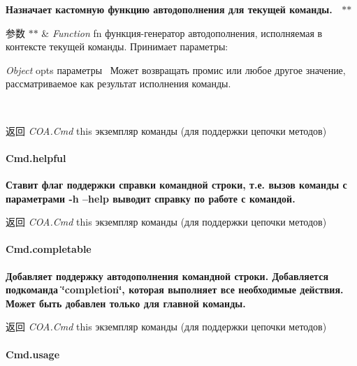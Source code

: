 {\bfseries {\bfseries {\bfseries  Назначает кастомную функцию автодополнения для текущей команды.~\newline
 $\ast$$\ast$
\begin{DoxyParams}{参数}
{\em $\ast$$\ast$} & {\itshape Function} {\ttfamily fn} функция-\/генератор автодополнения, исполняемая в контексте текущей команды. Принимает параметры\+:~\newline

\begin{DoxyItemize}
\item {\itshape Object} {\ttfamily opts} параметры~\newline
 Может возвращать промис или любое другое значение, рассматриваемое как результат исполнения команды.~\newline
 {\bfseries }
\end{DoxyItemize}\\
\hline
\end{DoxyParams}
\begin{DoxyReturn}{返回}
{\bfseries } {\itshape C\+O\+A.\+Cmd} {\ttfamily this} экземпляр команды (для поддержки цепочки методов)
\end{DoxyReturn}
\paragraph*{Cmd.\+helpful}}}}

{\bfseries {\bfseries {\bfseries  Ставит флаг поддержки справки командной строки, т.\+е. вызов команды с параметрами -\/h --help выводит справку по работе с командой.~\newline
 {\bfseries \begin{DoxyReturn}{返回}
{\itshape C\+O\+A.\+Cmd} {\ttfamily this} экземпляр команды (для поддержки цепочки методов)
\end{DoxyReturn}
\paragraph*{Cmd.\+completable}}}}}

{\bfseries {\bfseries {\bfseries {\bfseries  Добавляет поддержку автодополнения командной строки. Добавляется подкоманда \char`\"{}completion\char`\"{}, которая выполняет все необходимые действия.~\newline
 Может быть добавлен только для главной команды.~\newline
 {\bfseries \begin{DoxyReturn}{返回}
{\itshape C\+O\+A.\+Cmd} {\ttfamily this} экземпляр команды (для поддержки цепочки методов)
\end{DoxyReturn}
\paragraph*{Cmd.\+usage}}}}}}

